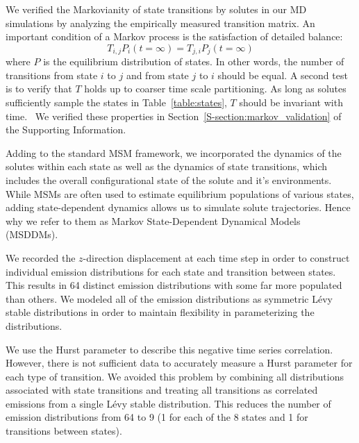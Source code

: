 \documentclass{article}
\begin{document}
  We verified the Markovianity of state transitions by solutes in our MD simulations 
  by analyzing the empirically measured transition matrix. An important condition
  of a Markov process is the satisfaction of detailed balance:
  \begin{equation}
  T_{i,j}P_i(t=\infty) = T_{j,i}P_j(t=\infty)
  \end{equation}
  where $P$ is the equilibrium distribution of states. In other words, the number of
  transitions from state $i$ to $j$ and from state $j$ to $i$ should be equal. A second
  test is to verify that $T$ holds up to coarser time scale partitioning. As long as solutes
  sufficiently sample the states in Table~\ref{table:states}, $T$ should be invariant
  with time.~\cite{swope_describing_2004} We verified these properties 
  in Section~\ref{S-section:markov_validation} of the Supporting Information.
  
  Adding to the standard MSM framework, we incorporated the dynamics of the solutes
  within each state as well as the dynamics of state transitions, which includes the
  overall configurational state of the solute and it's environments. 
  While MSMs are often used to estimate equilibrium populations of various states, adding 
  state-dependent dynamics allows us to simulate solute trajectories.
  Hence why we refer to them as Markov State-Dependent Dynamical Models (MSDDMs). 
  
  We recorded the $z$-direction displacement at each time step in order to construct 
  individual emission distributions for each state and transition between states. 
  This results in 64 distinct emission distributions with some far more populated than
  others. We modeled all of the emission distributions as symmetric L\'evy stable 
  distributions in order to maintain flexibility in parameterizing the distributions.
  
  We use the Hurst parameter to describe this negative time series correlation.
  However, there is not sufficient data to accurately measure a Hurst parameter for 
  each type of transition. We avoided this problem by combining all distributions 
  associated with state transitions and treating all transitions as correlated
  emissions from a single L\'evy stable distribution. This reduces the number of emission
  distributions from 64 to 9 (1 for each of the 8 states and 1 for transitions between states).  
  
\end{document}
